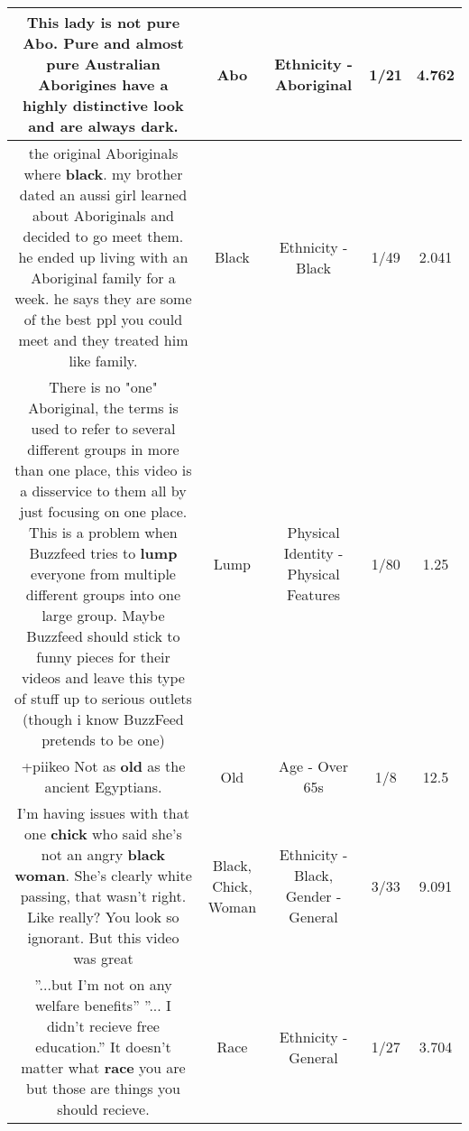 \documentclass[11pt]{article}
\newlength\mylength
\begin{document}
\begin{center}
\begin{longtable}{|C{.65\mylength}|C{.30\mylength}|C{.12\mylength}|C{.12\mylength}|C{.12\mylength}|}
  \small This lady is not pure \textbf{Abo}. Pure and almost pure Australian Aborigines have a highly distinctive look and are always dark.\normalsize   & Abo & Ethnicity - Aboriginal & 1/21 & 4.762 \\  \hline
  \small the original Aboriginals where \textbf{black}. my brother dated an aussi girl learned about Aboriginals and decided to go meet them. he ended up living with an Aboriginal family for a week. he says they are some of the best ppl you could meet and they treated him like family.\normalsize   & Black & Ethnicity - Black & 1/49 & 2.041 \\  \hline
  \small There is no "one" Aboriginal, the terms is used to refer to several different groups in more than one place, this video is a disservice to them all by just focusing on one place. This is a problem when Buzzfeed tries to \textbf{lump} everyone from multiple different groups into one large group.  Maybe Buzzfeed should stick to funny pieces for their videos and leave this type of stuff up to serious outlets (though i know BuzzFeed pretends to be one)\normalsize   & Lump & Physical Identity - Physical Features & 1/80 & 1.25 \\  \hline
  \small +piikeo Not as \textbf{old} as the ancient Egyptians.\normalsize   & Old & Age - Over 65s & 1/8 & 12.5 \\  \hline
  \small I'm having issues with that one \textbf{chick} who said she's not an angry \textbf{black} \textbf{woman}. She's clearly white passing, that wasn't right. Like really? You look so ignorant. But this video was great\normalsize   & Black, Chick, Woman & Ethnicity - Black, Gender - General & 3/33 & 9.091 \\  \hline
  \small ''...but I'm not on any welfare benefits'' ''... I didn't recieve free education.'' It doesn't matter what \textbf{race} you are but those are things you should recieve.\normalsize   & Race & Ethnicity - General & 1/27 & 3.704 \\  \hline

\end{longtable}
\end{center}
\end{document}
